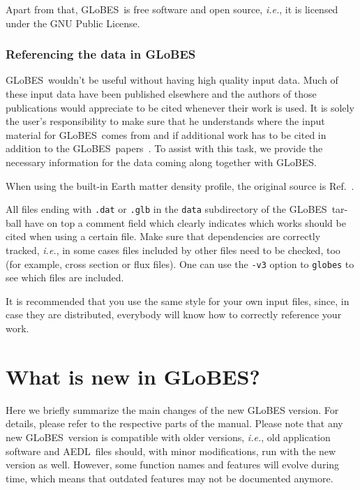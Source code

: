 \documentclass[a4paper,12pt,twoside]{book}
\newcommand{\ie}{{\it i.e.}}
\newcommand{\Ref}{Ref.}
\newcommand{\GLOBES}{{\sf GLoBES}}
\newcommand{\AEDL}{{\sf AEDL}}
\begin{document}
Apart from that, \GLOBES\ is free software and open source, \ie, it is 
licensed under the GNU Public License.

\subsection*{Referencing the data in \GLOBES}
\label{ref_data}

\index{norm}{Referencing!data in \GLOBES}
\GLOBES\ wouldn't be useful without having high quality input data.
Much of these input data have been published elsewhere and the authors
of those publications would appreciate to be cited whenever their work
is used. It is solely the user's responsibility 
to make sure that he understands where the input material for \GLOBES\ comes
from and if additional work has to be cited in addition to the 
\GLOBES\ papers~\cite{globes_paper,globes_paper_two}. To assist with this task, we provide  the necessary information for the data coming along together with \GLOBES.

When using the built-in Earth matter density profile, the 
original source is \Ref~\cite{Stacey}.

All files ending with \verb+.dat+ or \verb+.glb+ 
in the \verb+data+ subdirectory of the \GLOBES\ tar-ball have on top a comment field which clearly indicates which works should be
cited when using a certain file. Make sure that dependencies are correctly
tracked, \ie , in some cases files included by other files need to be 
checked, too (for example, cross section or flux files). One can use 
the \verb+-v3+ option to \verb+globes+ to see which files
are included.

It is recommended that you use the same style for your own input files, since, in case they are distributed, everybody will know how to correctly reference your work.

\chapter*{What is new in \GLOBES ?}

Here we briefly summarize the main changes of the new GLoBES version. For details, please
refer to the respective parts of the manual. Please note that any new \GLOBES\ version is
compatible with older versions, \ie, old application software and \AEDL\ files should, with minor
modifications, run with the new version as well.  However, some function names and features will
evolve during time, which means that outdated features may not be documented anymore.
\end{document}
